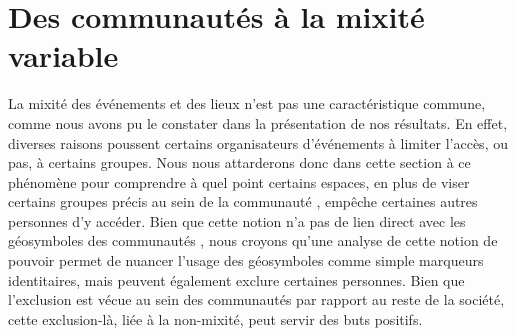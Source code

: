 \section{Des communautés à la mixité variable}
La mixité des événements et des lieux \lgbt{} n'est pas une caractéristique commune, comme nous avons pu le constater dans la présentation de nos résultats.
En effet, diverses raisons poussent certains organisateurs d'événements à limiter l'accès, ou pas, à certains groupes.
Nous nous attarderons donc dans cette section à ce phénomène pour comprendre à quel point certains espaces, en plus de viser certains groupes précis au sein de la communauté \lgbt{}, empêche certaines autres personnes d'y accéder.
Bien que cette notion n'a pas de lien direct avec les géosymboles des communautés \lgbt{}, nous croyons qu'une analyse de cette notion de pouvoir permet de nuancer l'usage des géosymboles comme simple marqueurs identitaires, mais peuvent également exclure certaines personnes.
Bien que l'exclusion est vécue au sein des communautés \lgbt{} par rapport au reste de la société, cette exclusion-là, liée à la non-mixité, peut servir des buts positifs.


